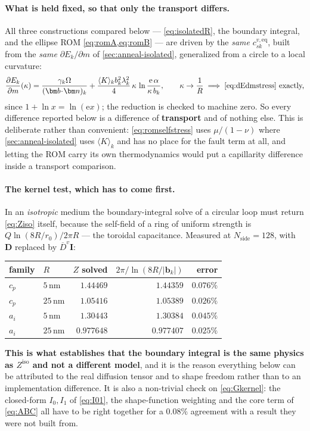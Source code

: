 \documentclass{article}
\newcommand{\bvec}{\bm b}
\newcommand{\nvec}{\bm n}
\newcommand{\Dten}{\bm D}
\begin{document}
\paragraph{What is held fixed, so that only the transport differs.} All three
constructions compared below --- \cref{eq:isolatedR}, the boundary integral, and
the ellipse ROM \cref{eq:romA,eq:romB} --- are driven by the \emph{same}
$c^{v,\mathrm{eq}}_{sk}$, built from the \emph{same} $\partial E_k/\partial m$ of
\cref{sec:anneal-isolated}, generalized from a circle to a local curvature:
\begin{equation}
  \frac{\partial E_k}{\partial m}(\kappa)
   =\frac{\gamma_k\Omega}{(\bvec\!\cdot\!\nvec)_k}
    +\frac{\langle K\rangle_k b_k^2\lambda_k^2}{4}\,\kappa\,
     \ln\frac{\mathrm e\,\alpha}{\kappa\,b_k},
  \qquad
  \kappa\to\frac1R\;\Longrightarrow\;\text{\cref{eq:dEdmstress} exactly,}
  \label{eq:dEdmlocal}
\end{equation}
since $1+\ln x=\ln(\mathrm e x)$; the reduction is checked to machine zero. So
every difference reported below is a difference of \textbf{transport} and of
nothing else. This is deliberate rather than convenient: \cref{eq:romselfstress}
uses $\mu/(1-\nu)$ where \cref{sec:anneal-isolated} uses $\langle K\rangle_k$ and
has no place for the fault term at all, and letting the ROM carry its own
thermodynamics would put a capillarity difference inside a transport comparison.

\paragraph{The kernel test, which has to come first.} In an \emph{isotropic}
medium the boundary-integral solve of a circular loop must return \cref{eq:Ziso}
itself, because the self-field of a ring of uniform strength is
$Q\ln(8R/r_0)/2\pi R$ --- the toroidal capacitance. Measured at
$N_{\mathrm{side}}=128$, with $\Dten$ replaced by $\overline D^{v}\bm I$:
\begin{center}\small
\begin{tabular}{@{}llrrr@{}}
\toprule
family & $R$ & $Z$ solved & $2\pi/\ln(8R/|\bvec_k|)$ & error\\
\midrule
$c_p$ & $5\,$nm  & $1.44469$  & $1.44359$  & $0.076\%$\\
$c_p$ & $25\,$nm & $1.05416$  & $1.05389$  & $0.026\%$\\
$a_i$ & $5\,$nm  & $1.30443$  & $1.30384$  & $0.045\%$\\
$a_i$ & $25\,$nm & $0.977648$ & $0.977407$ & $0.025\%$\\
\bottomrule
\end{tabular}
\end{center}
\textbf{This is what establishes that the boundary integral is the same physics as
$Z^{\mathrm{iso}}$ and not a different model}, and it is the reason everything
below can be attributed to the real diffusion tensor and to shape freedom rather
than to an implementation difference. It is also a non-trivial check on
\cref{eq:Gkernel}: the closed-form $I_0,I_1$ of \cref{eq:I01}, the shape-function
weighting and the core term of \cref{eq:ABC} all have to be right together for a
$0.08\%$ agreement with a result they were not built from.
\end{document}
